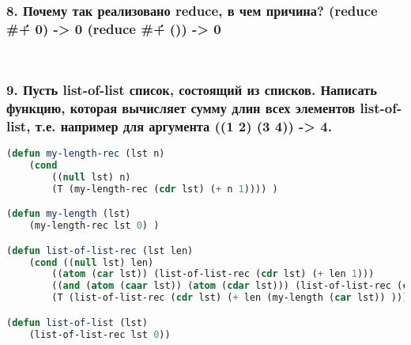 \newpage
\subsubsection*{8. Почему так реализовано reduce, в чем причина? \newline (reduce \#\' + 0) -> 0 \newline (reduce \#\' + ()) -> 0}
\begin{lstlisting}[language=Lisp]
	
\end{lstlisting}

\newpage
\subsubsection*{9. Пусть list-of-list список, состоящий из списков. Написать функцию, которая вычисляет сумму длин всех элементов list-of-list, т.е. например для аргумента ((1 2) (3 4)) -> 4.}
\begin{lstlisting}[language=Lisp]
(defun my-length-rec (lst n)
	(cond 
		((null lst) n)
		(T (my-length-rec (cdr lst) (+ n 1)))) )	

(defun my-length (lst)	
	(my-length-rec lst 0) )

(defun list-of-list-rec (lst len)
	(cond ((null lst) len)
		((atom (car lst)) (list-of-list-rec (cdr lst) (+ len 1)))
		((and (atom (caar lst)) (atom (cdar lst))) (list-of-list-rec (cdr lst) (+ len 2)))
		(T (list-of-list-rec (cdr lst) (+ len (my-length (car lst)) )))))

(defun list-of-list (lst)
	(list-of-list-rec lst 0))
\end{lstlisting}
